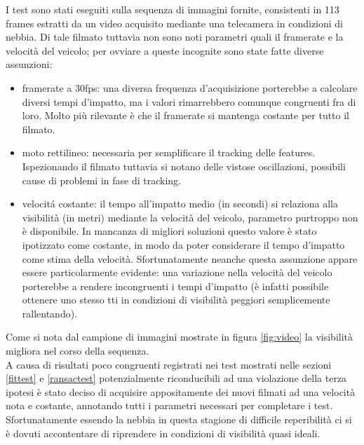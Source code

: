 \documentclass[12pt]{report}
\begin{document}
\noindent I test sono stati eseguiti sulla sequenza di immagini fornite, consistenti in 113 frames estratti da un video acquisito mediante una telecamera in condizioni di nebbia. Di tale filmato tuttavia non sono noti parametri quali il framerate e la velocit\`a del veicolo; per ovviare a queste incognite sono state fatte diverse assunzioni:
\begin{itemize}
	\item	framerate a 30fps: una diversa frequenza d'acquisizione porterebbe a calcolare diversi tempi d'impatto, ma i valori rimarrebbero comunque congruenti fra di loro. Molto pi\`u rilevante \`e che il framerate si mantenga costante per tutto il filmato.
	\item	moto rettilineo: necessaria per semplificare il tracking delle features. Ispezionando il filmato tuttavia si notano delle vistose oscillazioni, possibili cause di problemi in fase di tracking.
	\item	velocit\'a costante: il tempo all'impatto medio (in secondi) si relaziona alla visibilit\`a (in metri) mediante la velocit\`a del veicolo, parametro purtroppo non \`e disponibile. In mancanza di migliori soluzioni questo valore \`e stato ipotizzato come costante, in modo da poter considerare il tempo d'impatto come stima della velocit\`a. Sfortunatamente neanche questa assunzione appare essere particolarmente evidente: una variazione nella velocit\`a del veicolo porterebbe a rendere incongruenti i tempi d'impatto (\`e infatti possibile ottenere uno stesso tti in condizioni di visibilit\`a peggiori semplicemente rallentando).
\end{itemize}
\noindent Come si nota dal campione di immagini mostrate in figura \ref{fig:video} la visibilit\`a migliora nel corso della sequenza.\\

\noindent A causa di risultati poco congruenti registrati nei test mostrati nelle sezioni \ref{fittest} e \ref{ransactest} potenzialmente riconducibili ad una violazione della terza ipotesi \`e stato deciso di acquisire appositamente dei nuovi filmati ad una velocit\`a nota e costante, annotando tutti i parametri necessari per completare i test. Sfortunatamente essendo la nebbia in questa stagione di difficile reperibilit\`a ci si \`e dovuti accontentare di riprendere in condizioni di visibilit\`a quasi ideali.\\
\end{document}
